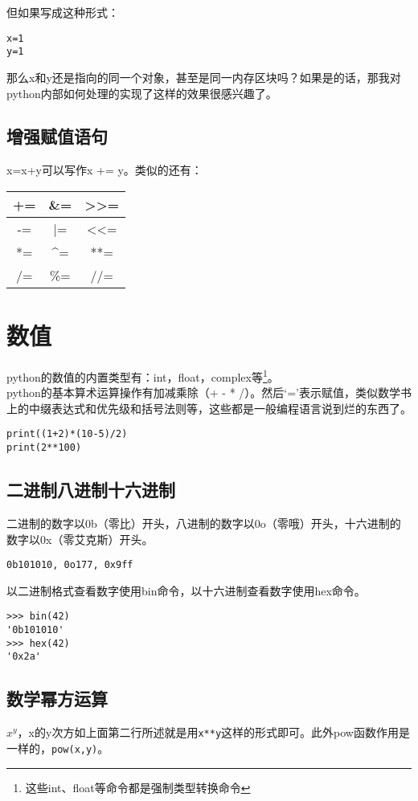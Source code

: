 \documentclass[12pt,oneside]{book}
\begin{document}
\begin{common-format}
但如果写成这种形式：
\begin{Verbatim}
x=1
y=1
\end{Verbatim}
那么x和y还是指向的同一个对象，甚至是同一内存区块吗？如果是的话，那我对python内部如何处理的实现了这样的效果很感兴趣了。


\subsection{增强赋值语句}
x=x+y可以写作x += y。类似的还有：
\begin{tabular}{|c|c|c|}
\hline 
+= & \&{}= & >>= \\ 
\hline 
-= & |= & <<= \\ 
\hline 
*= & \^{}= & **= \\ 
\hline 
/= & \%{}= & //= \\ 
\hline 
\end{tabular} 




\section{数值}
python的数值的内置类型有：int，float，complex等\footnote{这些int、float等命令都是强制类型转换命令}。\\python的基本算术运算操作有加减乘除（+ - * /）。然后‘=’表示赋值，类似数学书上的中缀表达式和优先级和括号法则等，这些都是一般编程语言说到烂的东西了。

\begin{Verbatim}
print((1+2)*(10-5)/2)
print(2**100)
\end{Verbatim}

\subsection{二进制八进制十六进制}
二进制的数字以0b（零比）开头，八进制的数字以0o（零哦）开头，十六进制的数字以0x（零艾克斯）开头。
\begin{Verbatim}
0b101010, 0o177, 0x9ff
\end{Verbatim}

以二进制格式查看数字使用bin命令，以十六进制查看数字使用hex命令。
\begin{Verbatim}
>>> bin(42)
'0b101010'
>>> hex(42)
'0x2a'
\end{Verbatim}




\subsection{数学幂方运算}
$ x^y $，x的y次方如上面第二行所述就是用\verb+x**y+这样的形式即可。此外pow函数作用是一样的，\verb+pow(x,y)+。



\end{common-format}
\end{document}
